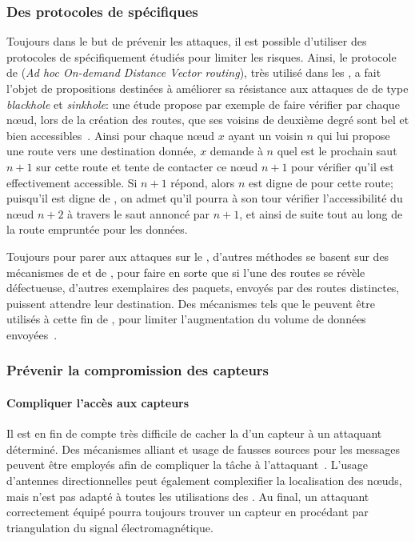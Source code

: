 \pagebreak %
    \subsubsection{Des protocoles de  spécifiques}
Toujours dans le but de prévenir les attaques, il est possible d'utiliser des protocoles de  spécifiquement étudiés pour limiter les risques.
Ainsi, le protocole de  \aodv (\textit{Ad hoc On-demand Distance Vector routing}), très utilisé dans les \rcs, a fait l'objet de propositions destinées à améliorer sa résistance aux attaques de \dds de type \textit{blackhole} et \textit{sinkhole}: une étude propose par exemple de faire vérifier par chaque nœud, lors de la création des routes, que ses voisins de deuxième degré sont bel et bien accessibles~\cite{DLA02}.
Ainsi pour chaque nœud $x$ ayant un voisin $n$ qui lui propose une route vers une destination donnée, $x$ demande à $n$ quel est le prochain saut $n+1$ sur cette route et tente de contacter ce nœud $n+1$ pour vérifier qu'il est effectivement accessible.
Si $n+1$ répond, alors $n$ est digne de  pour cette route; puisqu'il est digne de , on admet qu'il pourra à son tour vérifier l'accessibilité du nœud $n+2$ à travers le saut annoncé par $n+1$, et ainsi de suite tout au long de la route empruntée pour les données.

Toujours pour parer aux attaques sur le , d'autres méthodes se basent sur des mécanismes de  et de \resilience, pour faire en sorte que si l'une des routes se révèle défectueuse, d'autres exemplaires des paquets, envoyés par des routes distinctes, puissent attendre leur destination.
Des mécanismes tels que le  peuvent être utilisés à cette fin de , pour limiter l'augmentation du volume de données envoyées~\cite{MMB13}.

    \subsubsection{Prévenir la compromission des capteurs}
        \paragraph{Compliquer l'accès aux capteurs}
Il est en fin de compte très difficile de cacher la  d'un capteur à un attaquant déterminé.
Des mécanismes alliant  et usage de fausses sources pour les messages peuvent être employés afin de compliquer la tâche à l'attaquant~\cite{GK13}.
L'usage d'antennes directionnelles peut également complexifier la localisation des nœuds, mais n'est pas adapté à toutes les utilisations des \rcs.
Au final, un attaquant correctement équipé pourra toujours trouver un capteur en procédant par triangulation du signal électromagnétique.

